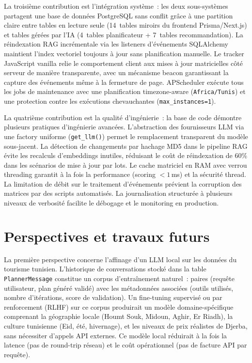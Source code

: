 La troisième contribution est l'intégration système~: les deux sous-systèmes partagent une
base de données PostgreSQL sans conflit grâce à une partition claire entre tables en lecture
seule (14~tables miroirs du frontend Prisma/Next.js) et tables gérées par l'IA
(4~tables planificateur + 7~tables recommandation). La réindexation RAG incrémentale via
les listeners d'événements SQLAlchemy maintient l'index vectoriel toujours à jour sans
planification manuelle. Le tracker JavaScript vanilla relie le comportement client aux
mises à jour matricielles côté serveur de manière transparente, avec un mécanisme beacon
garantissant la capture des événements même à la fermeture de page. APScheduler exécute
tous les jobs de maintenance avec une planification timezone-aware (\texttt{Africa/Tunis})
et une protection contre les exécutions chevauchantes (\texttt{max\_instances=1}).

La quatrième contribution est la qualité d'ingénierie~: la base de code démontre plusieurs
pratiques d'ingénierie avancées. L'abstraction des fournisseurs LLM via une factory
uniforme (\texttt{get\_llm()}) permet le remplacement transparent du modèle sous-jacent.
La détection de changements par hachage MD5 dans le pipeline RAG évite les
recalculs d'embeddings inutiles, réduisant le coût de réindexation de 60\% dans les
scénarios de mise à jour par lots. Le cache matriciel en RAM avec verrou threading garantit
à la fois la performance (scoring $< 1$\,ms) et la sécurité thread. La limitation de
débit sur le traitement d'événements prévient la corruption des matrices par des scripts
automatisés. La journalisation structurée à plusieurs niveaux de verbosité facilite le
débogage et le monitoring en production.


\section*{Perspectives et travaux futurs}

La première perspective concerne l'affinage d'un LLM local sur les données du tourisme
tunisien. L'historique de conversations stocké dans la table \texttt{PlannerMessage}
constitue un corpus d'entraînement naturel~: paires (requête utilisateur, plan généré validé)
avec les métadonnées associées (outils utilisés, nombre d'itérations, score de validation).
Un fine-tuning supervisé ou par renforcement (RLHF) sur ce corpus produirait un modèle
domaine-spécifique comprenant la géographie locale (Houmt Souk, Midoun, Aghir, Er Riadh),
la culture tunisienne (Eid, été, hivernage), et les niveaux de prix réalistes de Djerba,
sans nécessiter d'appels API externes. Ce modèle local réduirait à la fois la latence
(pas de round-trip réseau) et le coût opérationnel (pas de facture API par requête).

